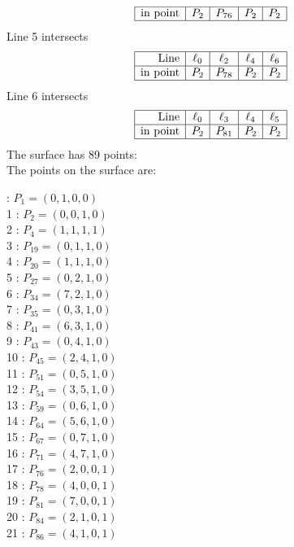 \documentclass{article}
\begin{document}
{$$\begin{array}{|r*{4}{|c}|}
\hline
\mbox{in point}  & P_{2} & P_{76} & P_{2} & P_{2}\\
\hline
\end{array}
$$
Line 5 intersects 
$$
\begin{array}{|r*{4}{|c}|}
\hline
\mbox{Line}  & \ell_{0} & \ell_{2} & \ell_{4} & \ell_{6}\\
\hline
\mbox{in point}  & P_{2} & P_{78} & P_{2} & P_{2}\\
\hline
\end{array}
$$
Line 6 intersects 
$$
\begin{array}{|r*{4}{|c}|}
\hline
\mbox{Line}  & \ell_{0} & \ell_{3} & \ell_{4} & \ell_{5}\\
\hline
\mbox{in point}  & P_{2} & P_{81} & P_{2} & P_{2}\\
\hline
\end{array}
$$
The surface has 89 points:\\
The points on the surface are:\\
\begin{multicols}{3}
 : $P_{1}=( 0, 1, 0, 0 )$\\
1 : $P_{2}=( 0, 0, 1, 0 )$\\
2 : $P_{4}=( 1, 1, 1, 1 )$\\
3 : $P_{19}=( 0, 1, 1, 0 )$\\
4 : $P_{20}=( 1, 1, 1, 0 )$\\
5 : $P_{27}=( 0, 2, 1, 0 )$\\
6 : $P_{34}=( 7, 2, 1, 0 )$\\
7 : $P_{35}=( 0, 3, 1, 0 )$\\
8 : $P_{41}=( 6, 3, 1, 0 )$\\
9 : $P_{43}=( 0, 4, 1, 0 )$\\
10 : $P_{45}=( 2, 4, 1, 0 )$\\
11 : $P_{51}=( 0, 5, 1, 0 )$\\
12 : $P_{54}=( 3, 5, 1, 0 )$\\
13 : $P_{59}=( 0, 6, 1, 0 )$\\
14 : $P_{64}=( 5, 6, 1, 0 )$\\
15 : $P_{67}=( 0, 7, 1, 0 )$\\
16 : $P_{71}=( 4, 7, 1, 0 )$\\
17 : $P_{76}=( 2, 0, 0, 1 )$\\
18 : $P_{78}=( 4, 0, 0, 1 )$\\
19 : $P_{81}=( 7, 0, 0, 1 )$\\
20 : $P_{84}=( 2, 1, 0, 1 )$\\
21 : $P_{86}=( 4, 1, 0, 1 )$\\

\end{multicols}}
\end{document}
